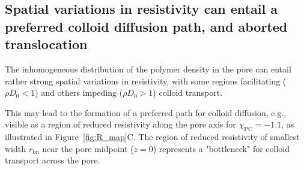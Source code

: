 \documentclass[12pt, a4paper]{article}
\begin{document}




\subsection{Spatial variations in resistivity can entail a preferred colloid diffusion path, and aborted translocation}

 The inhomogeneous distribution of the polymer density in the pore can entail rather strong spatial variations in resistivity, with some regions facilitating ($\rho D_0 < 1$) and others impeding ($\rho D_0 > 1$) colloid transport.

This may lead to the formation of a preferred path for colloid diffusion, e.g., visible as a region of reduced resistivity along the pore axis for $\chi_{\text{PC}} = -1.1$, as illustrated in Figure~\ref{fig:R_map}C.
The region of reduced resistivity of smallest width $r_{\text{bn}}$ near the pore midpoint ($z=0$) represents a "bottleneck" for colloid transport across the pore.

\end{document}
